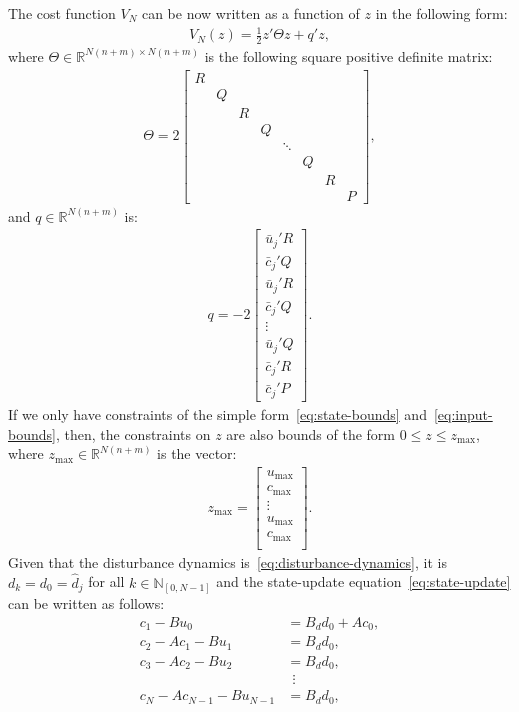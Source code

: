 \documentclass[12pt]{report}
\newcommand{\N}{\mathbb{N}}
\renewcommand{\Re}{\mathbb{R}}
\newcommand{\bcj}{\bar{c}_j}
\newcommand{\buj}{\bar{u}_j}
\begin{document}
The cost function $V_N$ can be now written as a function of $z$ in the following
form:
\begin{align}
V_N(z) = \frac{1}{2}z' \Theta z + q'z,
\end{align}
where $\Theta\in\Re^{N(n+m)\times N(n+m)}$ is the following square positive definite matrix:
\begin{align}
\Theta=2\left[
\begin{array}{cccccccc}
R\\
&Q\\
&&R\\
&&&Q\\
&&&&\ddots\\
&&&&&Q\\
&&&&&&R\\
&&&&&&&P
\end{array}\right],
\end{align}
and $q\in \Re^{N(n+m)}$ is:
\begin{align}
q=-2\left[
\begin{array}{c}
\buj' R\\
\bcj' Q\\
\buj' R\\
\bcj' Q\\
\vdots\\
\buj' Q\\
\bcj' R\\
\bcj' P
\end{array}\right].
\end{align}
If we only have constraints of the simple form~\eqref{eq:state-bounds} and~\eqref{eq:input-bounds},
then, the constraints on $z$ are also bounds of the form $0\leq z \leq z_{\max}$, where
$z_{\max}\in\Re^{N(n+m)}$ is the vector:
\begin{align}
z_{\max}=\left[
\begin{array}{c}
u_{\max}\\
c_{\max}\\
\vdots\\
u_{\max}\\
c_{\max}\\
\end{array}\right].
\end{align}
Given that the disturbance dynamics is~\eqref{eq:disturbance-dynamics}, 
it is $d_k=d_0=\hat{d}_j$ for all $k\in \N_{[0,N-1]}$ and the
state-update equation~\eqref{eq:state-update} can be written as follows:
\begin{align*}
c_1 - Bu_0 &= B_d d_0 + Ac_0,\\
c_2 - Ac_1 - Bu_1 &= B_d d_0,\\
c_3 - Ac_2 - Bu_2 &= B_d d_0,\\
&\ \ \vdots\\
c_N - Ac_{N-1}-Bu_{N-1} &= B_d d_0,
\end{align*}
\end{document}
